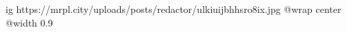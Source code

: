  
 
 
 
 

\ifcmt
  ig https://mrpl.city/uploads/posts/redactor/ulkiuijbhhsro8ix.jpg
  @wrap center
  @width 0.9
\fi
